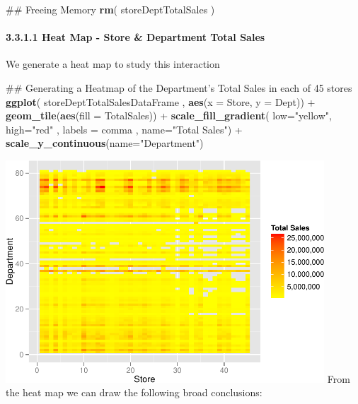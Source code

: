 \documentclass[]{article}
\newenvironment{Shaded}{\begin{snugshade}}{\end{snugshade}}
\newcommand{\KeywordTok}[1]{\textcolor[rgb]{0.13,0.29,0.53}{\textbf{{#1}}}}
\newcommand{\DataTypeTok}[1]{\textcolor[rgb]{0.13,0.29,0.53}{{#1}}}
\newcommand{\StringTok}[1]{\textcolor[rgb]{0.31,0.60,0.02}{{#1}}}
\newcommand{\NormalTok}[1]{{#1}}
\begin{document}
\begin{Shaded}
\begin{Highlighting}[]
\NormalTok{## Freeing Memory}
\KeywordTok{rm}\NormalTok{( storeDeptTotalSales )}
\end{Highlighting}
\end{Shaded}

\paragraph{3.3.1.1 Heat Map - Store \& Department Total
Sales}\label{heat-map---store-department-total-sales}

We generate a heat map to study this interaction

\begin{Shaded}
\begin{Highlighting}[]
\NormalTok{## Generating a Heatmap of the Department's Total Sales in each of 45 stores}
\KeywordTok{ggplot}\NormalTok{( storeDeptTotalSalesDataFrame , }\KeywordTok{aes}\NormalTok{(}\DataTypeTok{x =} \NormalTok{Store, }\DataTypeTok{y =} \NormalTok{Dept)) +}\StringTok{ }
\StringTok{  }\KeywordTok{geom_tile}\NormalTok{(}\KeywordTok{aes}\NormalTok{(}\DataTypeTok{fill =} \NormalTok{TotalSales)) +}
\StringTok{  }\KeywordTok{scale_fill_gradient}\NormalTok{(}
    \DataTypeTok{low=}\StringTok{"yellow"}\NormalTok{, }\DataTypeTok{high=}\StringTok{"red"} \NormalTok{, }\DataTypeTok{labels =} \NormalTok{comma , }\DataTypeTok{name=}\StringTok{"Total Sales"}\NormalTok{) +}
\StringTok{  }\KeywordTok{scale_y_continuous}\NormalTok{(}\DataTypeTok{name=}\StringTok{"Department"}\NormalTok{)}
\end{Highlighting}
\end{Shaded}

\includegraphics[width=450px]{PredictingWeeklySalesAtWalmart_files/figure-latex/heatmapStoreDept-1}
From the heat map we can draw the following broad conclusions:
\end{document}
